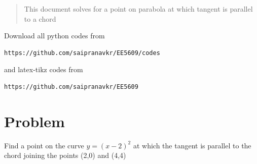 \documentclass[journal,12pt,twocolumn]{IEEEtran}
\begin{document}
%
\begin{abstract}
This document solves for a point on parabola at which tangent is parallel to a chord
\end{abstract}
Download all python codes from 
%
\begin{lstlisting}
https://github.com/saipranavkr/EE5609/codes
\end{lstlisting}
%
and latex-tikz codes from 
%
\begin{lstlisting}
https://github.com/saipranavkr/EE5609
\end{lstlisting}
%
\renewcommand{\theenumi}{\roman{enumi}}%
\section{Problem}
Find a point on the curve $y=(x-2)^2$ at which the tangent is parallel to the chord joining the points (2,0) and (4,4)
%
%
\end{document}
